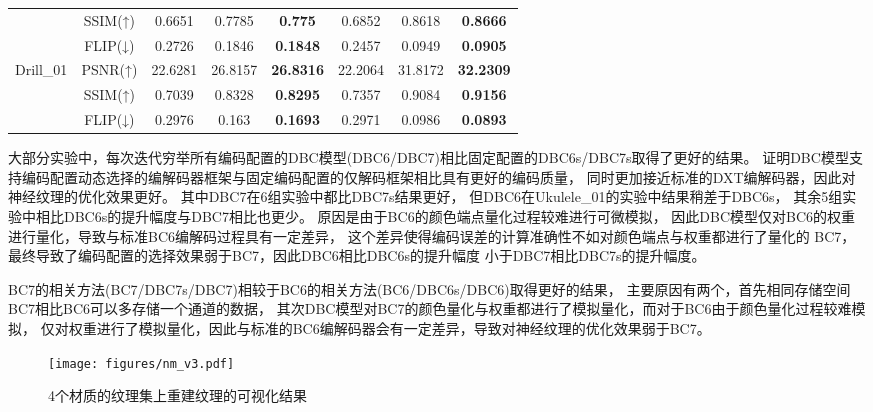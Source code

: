 \begin{table*}[htbp]
{\begin{tabular}{cccccccc}
                                             & SSIM(↑) & 0.6651 & 0.7785 & \textbf{0.775} &0.6852 & 0.8618 & \textbf{0.8666} \\
                                             & FLIP(↓) & 0.2726 & 0.1846 & \textbf{0.1848} & 0.2457 & 0.0949 & \textbf{0.0905} \\
        \midrule
        \multirow{3}{*}{Drill\_01}           & PSNR(↑) & 22.6281 & 26.8157 & \textbf{26.8316} & 22.2064 & 31.8172 & \textbf{32.2309} \\
                                             & SSIM(↑) & 0.7039 & 0.8328 & \textbf{0.8295} & 0.7357 & 0.9084 & \textbf{0.9156} \\
                                             & FLIP(↓) & 0.2976 & 0.163 & \textbf{0.1693} & 0.2971 & 0.0986 & \textbf{0.0893} \\
        \bottomrule
    \end{tabular}    
}   
\end{table*}

大部分实验中，每次迭代穷举所有编码配置的DBC模型(DBC6/DBC7)相比固定配置的DBC6s/DBC7s取得了更好的结果。
证明DBC模型支持编码配置动态选择的编解码器框架与固定编码配置的仅解码框架相比具有更好的编码质量，
同时更加接近标准的DXT编解码器，因此对神经纹理的优化效果更好。
其中DBC7在6组实验中都比DBC7s结果更好，
但DBC6在Ukulele\_01的实验中结果稍差于DBC6s，
其余5组实验中相比DBC6s的提升幅度与DBC7相比也更少。
原因是由于BC6的颜色端点量化过程较难进行可微模拟，
因此DBC模型仅对BC6的权重进行量化，导致与标准BC6编解码过程具有一定差异，
这个差异使得编码误差的计算准确性不如对颜色端点与权重都进行了量化的
BC7，最终导致了编码配置的选择效果弱于BC7，因此DBC6相比DBC6s的提升幅度
小于DBC7相比DBC7s的提升幅度。

BC7的相关方法(BC7/DBC7s/DBC7)相较于BC6的相关方法(BC6/DBC6s/DBC6)取得更好的结果，
主要原因有两个，首先相同存储空间BC7相比BC6可以多存储一个通道的数据，
其次DBC模型对BC7的颜色量化与权重都进行了模拟量化，而对于BC6由于颜色量化过程较难模拟，
仅对权重进行了模拟量化，因此与标准的BC6编解码器会有一定差异，导致对神经纹理的优化效果弱于BC7。

\begin{figure}[htbp]
    \centering
    \texttt{[image: figures/nm\_v3.pdf]}
    \caption{4个材质的纹理集上重建纹理的可视化结果}
    \label{fig:nm_v3}
\end{figure}

